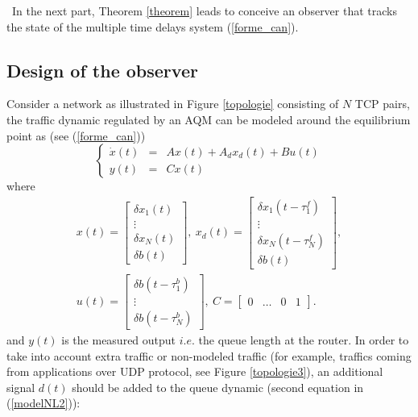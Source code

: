 \documentclass[a4paper, 10pt, onecolumn]{article}
\begin{document}
~\indent In the next part, Theorem \ref{theorem} leads to conceive an observer that tracks the state of the multiple time delays system (\ref{forme_can}).


\subsection{Design of the observer}

Consider a network as illustrated in Figure \ref{topologie} consisting of $N$ TCP pairs, the traffic dynamic regulated by an AQM can be modeled around the equilibrium point as (see (\ref{forme_can}))
\begin{equation}
\label{forme_can2}
\left\{\begin{array}{rcl}
\dot{x}(t)&=&Ax(t)+A_dx_d(t)+Bu(t)\\
y(t)&=&Cx(t)
\end{array}\right.
\end{equation}
where
\begin{equation*}
\begin{array}{c}
x(t)=\left[\begin{array}{c}\delta x_1(t)\\ \vdots \\ \delta x_N(t) \\ \delta b(t)\end{array}\right],~
x_d(t)=\left[\begin{array}{c}\delta x_1(t-\tau_1^f)\\ \vdots \\ \delta x_N(t-\tau_N^f)\\ \delta b(t)\end{array}\right],\\[0.3cm]
u(t)=\left[\begin{array}{c}\delta b(t-\tau_1^b)\\ \vdots \\ \delta b(t-\tau_N^b)\end{array}\right],~C=\left[\begin{array}{cccc}0&\ldots&0&1\end{array}\right].
\end{array}
\end{equation*}
and $y(t)$ is the measured output $i.e.$ the queue length at the router. In order to take into account extra traffic or non-modeled traffic (for example, traffics coming from applications over UDP protocol, see Figure \ref{topologie3}), an additional signal $d(t)$ should be added to the queue dynamic (second equation in (\ref{modelNL2})):
\end{document}
